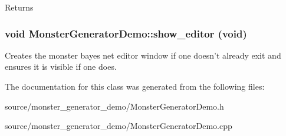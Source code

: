 \begin{DoxyReturn}{Returns}

\end{DoxyReturn}
\hypertarget{classMonsterGeneratorDemo_a79a6136789c43d0a1502b7ad0381079a}{
\subsubsection[{show\_\-editor}]{\setlength{\rightskip}{0pt plus 5cm}void MonsterGeneratorDemo::show\_\-editor (void)}}
\label{classMonsterGeneratorDemo_a79a6136789c43d0a1502b7ad0381079a}
Creates the monster bayes net editor window if one doesn't already exit and ensures it is visible if one does. 

The documentation for this class was generated from the following files:\begin{DoxyCompactItemize}
\item 
source/monster\_\-generator\_\-demo/MonsterGeneratorDemo.h\item 
source/monster\_\-generator\_\-demo/MonsterGeneratorDemo.cpp\end{DoxyCompactItemize}
